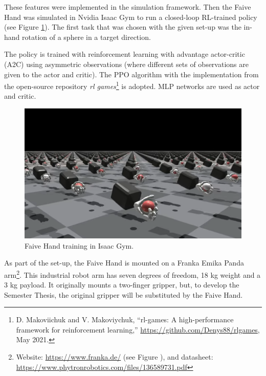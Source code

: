 \documentclass[a4paper]{article}
\begin{document}
These features were implemented in the simulation framework. Then the Faive Hand was simulated in Nvidia Isaac Gym to run a closed-loop RL-trained policy (see Figure \ref{FH}). The first task that was chosen with the given set-up was the in-hand rotation of a sphere in a target direction.

The policy is trained with reinforcement learning with advantage actor-critic (A2C) using asymmetric observations (where different sets of observations are given to the actor and critic). The PPO algorithm \cite{schulman2017proximal} with the implementation from the open-source repository \textit{rl games}\footnote{D. Makoviichuk and V. Makoviychuk, “rl-games: A high-performance framework for reinforcement learning,” \url{https://github.com/Denys88/rlgames}, May 2021.} is adopted. MLP networks are used as actor and critic.

\begin{figure}[!hb]
    \centering
    \includegraphics[scale=0.7]{images/Screenshot from 2023-10-11 23-38-03.png}
    \caption{Faive Hand training in Isaac Gym.}
    \label{FH}
\end{figure}

As part of the set-up, the Faive Hand is mounted on a Franka Emika Panda arm\footnote{Website: \url{https://www.franka.de/} (see Figure \label{FEP}), and datasheet: \url{https://www.phytronrobotics.com/files/136589731.pdf}}. This industrial robot arm has seven degrees of freedom, 18 kg weight and a 3 kg payload. It originally mounts a two-finger gripper, but, to develop the Semester Thesis, the original gripper will be substituted by the Faive Hand.

\newpage
\end{document}
